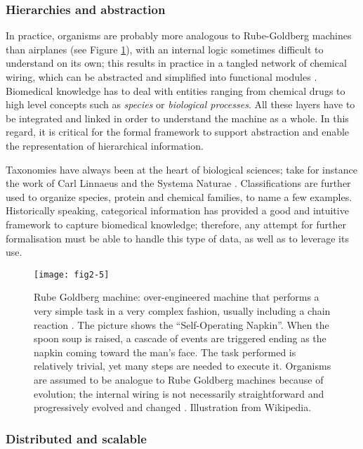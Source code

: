 \subsubsection{Hierarchies and abstraction}
\label{reqhie}

In practice, organisms are probably more analogous to Rube-Goldberg machines than airplanes (see Figure \ref{fig2-5}), with an internal logic sometimes difficult to understand on its own; this results in practice in a tangled network of chemical wiring, which can be abstracted and simplified into functional modules \citep{hartwell1999molecular} \citep{ravasz2002hierarchical} \citep{machado2011modeling} \citep{fisher2007executable}. Biomedical knowledge has to deal with entities ranging from chemical drugs to high level concepts such as \emph{species} or \emph{biological processes}. All these layers have to be integrated and linked in order to understand the machine as a whole. In this regard, it is critical for the formal framework to support abstraction and enable the representation of hierarchical information.

Taxonomies have always been at the heart of biological sciences; take for instance the work of Carl Linnaeus and the Systema Naturae \citep{von1770systema}. Classifications are further used to organize species, protein and chemical families, to name a few examples. Historically speaking, categorical information has provided a good and intuitive framework to capture biomedical knowledge; therefore, any attempt for further formalisation must be able to handle this type of data, as well as to leverage its use.

\begin{figure}[ht]
    \centering
    \texttt{[image: fig2-5]}
    \caption{Rube Goldberg machine: over-engineered machine that performs a very simple task in a very complex fashion, usually including a chain reaction \citep{rubewiki}. The picture shows the ``Self-Operating Napkin''. When the spoon soup is raised, a cascade of events are triggered ending as the napkin coming toward the man's face. The task performed is relatively trivial, yet many steps are needed to execute it. Organisms are assumed to be analogue to Rube Goldberg machines because of evolution; the internal wiring is not necessarily straightforward and progressively evolved and changed \citep{ravasz2002hierarchical}. Illustration from Wikipedia.}
    \label{fig2-5}
\end{figure}

\subsubsection{Distributed and scalable}
\label{reqscale}

